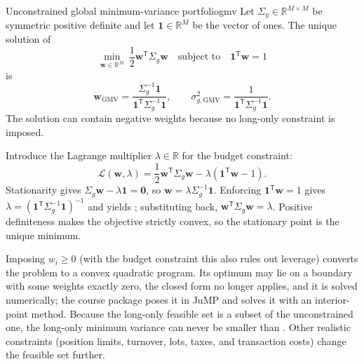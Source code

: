 \documentclass[11pt]{article}
\newcommand{\R}{\mathbb{R}}
\begin{document}
\begin{theorem}{Unconstrained global minimum-variance portfolio}{gmv}
Let $\Sigma_g\in\R^{M\times M}$ be symmetric positive definite and let $\mathbf1\in\R^M$ be the vector of ones. The unique solution of
\begin{equation}
  \label{eq:gmv-problem}
  \min_{\mathbf w\in\R^M}\ \frac12\mathbf w^{\mathsf T}\Sigma_g\mathbf w
  \quad\text{subject to}\quad
  \mathbf1^{\mathsf T}\mathbf w=1
\end{equation}
is
\begin{equation}
  \label{eq:gmv-solution}
  \mathbf w_{\mathrm{GMV}}
  =\frac{\Sigma_g^{-1}\mathbf1}
  {\mathbf1^{\mathsf T}\Sigma_g^{-1}\mathbf1},
  \qquad
  \sigma_{g,\mathrm{GMV}}^2
  =\frac{1}{\mathbf1^{\mathsf T}\Sigma_g^{-1}\mathbf1}.
\end{equation}
The solution can contain negative weights because no long-only constraint is imposed.
\end{theorem}

\begin{derivation}
Introduce the Lagrange multiplier $\lambda\in\R$ for the budget constraint:
\begin{equation*}
  \mathcal L(\mathbf w,\lambda)
  =\frac12\mathbf w^{\mathsf T}\Sigma_g\mathbf w
  -\lambda(\mathbf1^{\mathsf T}\mathbf w-1).
\end{equation*}
Stationarity gives $\Sigma_g\mathbf w-\lambda\mathbf1=\mathbf0$, so $\mathbf w=\lambda\Sigma_g^{-1}\mathbf1$. Enforcing $\mathbf1^{\mathsf T}\mathbf w=1$ gives $\lambda=(\mathbf1^{\mathsf T}\Sigma_g^{-1}\mathbf1)^{-1}$ and yields ; substituting back, $\mathbf w^{\mathsf T}\Sigma_g\mathbf w=\lambda$. Positive definiteness makes the objective strictly convex, so the stationary point is the unique minimum.
\end{derivation}

Imposing $w_i\geq0$ (with the budget constraint this also rules out leverage) converts the problem to a convex quadratic program. Its optimum may lie on a boundary with some weights exactly zero, the closed form no longer applies, and it is solved numerically; the course package poses it in JuMP and solves it with an interior-point method. Because the long-only feasible set is a subset of the unconstrained one, the long-only minimum variance can never be smaller than . Other realistic constraints (position limits, turnover, lots, taxes, and transaction costs) change the feasible set further.
\end{document}
